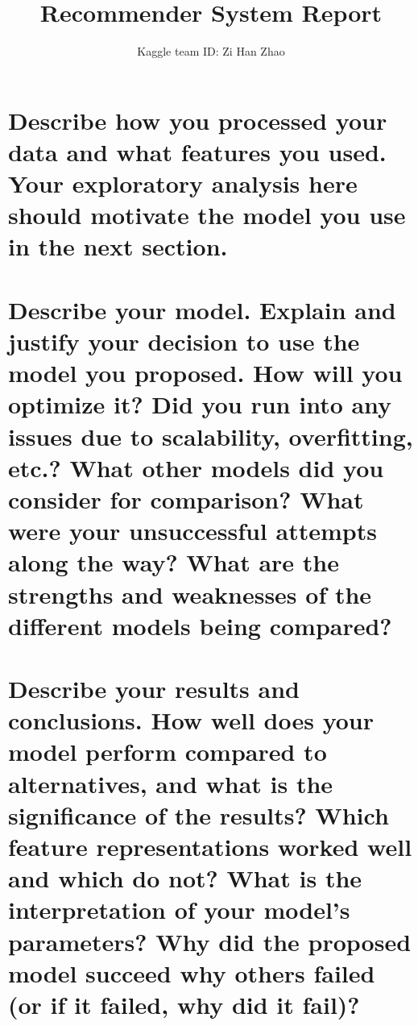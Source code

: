 \documentclass[12pt]{article}
\author{Kaggle team ID: Zi Han Zhao}
\affil{Student ID: zhaozih3}
\title{Recommender System Report}
\date{}
\begin{document}
\maketitle
\section{Describe how you processed your data and what features you used. Your exploratory analysis
here should motivate the model you use in the next section.}
\section{Describe your model. Explain and justify your decision to use the model you proposed. How
will you optimize it? Did you run into any issues due to scalability, overfitting, etc.? What
other models did you consider for comparison? What were your unsuccessful attempts along
the way? What are the strengths and weaknesses of the different models being compared?}
\section{Describe your results and conclusions. How well does your model perform compared to
alternatives, and what is the significance of the results? Which feature representations worked
well and which do not? What is the interpretation of your model’s parameters? Why did the
proposed model succeed why others failed (or if it failed, why did it fail)?}
\end{document}

